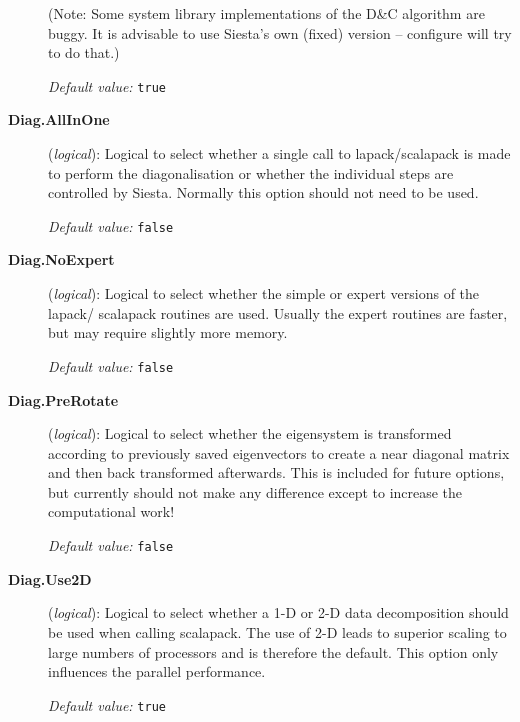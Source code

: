 \documentclass[11pt]{article}
\begin{document}
\begin{description}
(Note: Some system library implementations of the D\&C algorithm are
buggy. It is advisable to use Siesta's own (fixed) version -- configure will
try to do that.)

{\it Default value:} {\tt true}

\item[{\bf Diag.AllInOne}] ({\it logical}): 
Logical to select whether a single call to lapack/scalapack is made to 
perform the diagonalisation or whether the individual steps are controlled
by {\sc Siesta}. Normally this option should not need to be used.

{\it Default value:} {\tt false}

\item[{\bf Diag.NoExpert}] ({\it logical}): 
Logical to select whether the simple or expert versions of the lapack/
scalapack routines are used. Usually the expert routines are faster, but
may require slightly more memory.

{\it Default value:} {\tt false}

\item[{\bf Diag.PreRotate}] ({\it logical}): 
Logical to select whether the eigensystem is transformed according to 
previously saved eigenvectors to create a near diagonal matrix and then 
back transformed afterwards. This is included for future options, but
currently should not make any difference except to increase the 
computational work!

{\it Default value:} {\tt false}

\item[{\bf Diag.Use2D}] ({\it logical}): 
Logical to select whether a 1-D or 2-D data decomposition should be used
when calling scalapack. The use of 2-D leads to superior scaling to 
large numbers of processors and is therefore the default. This option 
only influences the parallel performance.

{\it Default value:} {\tt true}

\end{description}
\end{document}
